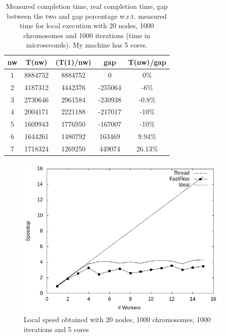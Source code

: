 \documentclass{article}
\begin{document}
        \begin{table}[h!]
            \begin{center}
                \caption{Measured completion time, real completion time, gap between the two and gap percentage w.r.t. measured time for local execution with 20 nodes, 1000 chromosomes and 1000 iterations (time in microseconds). My machine has 5 cores.}
                \label{tab:table1}
                \begin{tabular}{c|c|c|c|c}
                    \textbf{nw} & \textbf{T(nw)} & \textbf{(T(1)/nw)} & \textbf{gap} & \textbf{T(nw)/gap}\\
                    \hline
                        1 & 8884752 & 8884752 & 0 & 0\%\\
                        2 & 4187312 & 4442376 & -255064 & -6\%\\
			3 & 2730646 & 2961584 & -230938 & -0.8\%\\
			4 & 2004171 & 2221188 & -217017 & -10\%\\
			5 & 1609943 & 1776950 & -167007 & -10\%\\
			6 & 1644261 & 1480792 & 163469 & 9.94\%\\
			7 & 1718324 & 1269250 & 449074 & 26.13\%\\
                \end{tabular}
            \end{center}
        \end{table}


    \begin{figure}
        \includegraphics[width=\linewidth, height=8cm]{img/local_speedup.png}
        \caption{Local speed obtained with 20 nodes, 1000 chromosomes, 1000 iterations and 5 cores}
        \label{fig:locals}
    \end{figure}
\end{document}
